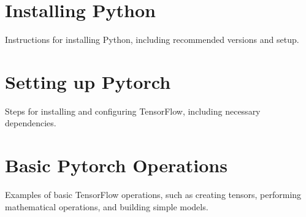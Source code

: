 \section{Installing Python}
Instructions for installing Python, including recommended versions and setup.

\section{Setting up Pytorch}
Steps for installing and configuring TensorFlow, including necessary dependencies.

\section{Basic Pytorch Operations}
Examples of basic TensorFlow operations, such as creating tensors, performing mathematical operations, and building simple models.
